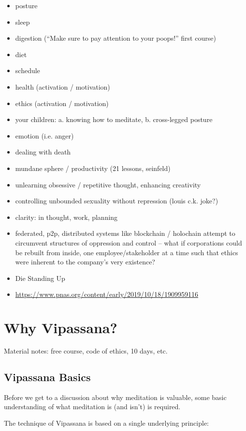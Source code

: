 \documentclass[a4paper, amsfonts, amssymb, amsmath, reprint, showkeys, nofootinbib, twoside]{revtex4-1}
\begin{document}
\begin{itemize}
  \item posture
  \item sleep
  \item digestion (``Make sure to pay attention to your poops!'' first course)
  \item diet
  \item schedule
  \item health (activation / motivation)
  \item ethics (activation / motivation)
  \item your children: a. knowing how to meditate, b. cross-legged posture
  \item emotion (i.e. anger)
  \item dealing with death
  \item mundane sphere / productivity (21 lessons, seinfeld)
  \item unlearning obsessive / repetitive thought, enhancing creativity
  \item controlling unbounded sexuality without repression (louis c.k. joke?)
  \item clarity: in thought, work, planning
  \item federated, p2p, distributed systems like blockchain / holochain attempt to circumvent
    structures of oppression and control -- what if corporations could be rebuilt from inside,
    one employee/stakeholder at a time such that ethics were inherent to the company's very
    existence?
  \item Die Standing Up
  \item \url{https://www.pnas.org/content/early/2019/10/18/1909959116}
\end{itemize}


\section{Why Vipassana?}

Material notes: free course, code of ethics, 10 days, etc.

\subsection{Vipassana Basics}

Before we get to a discussion about why meditation is valuable, some basic
understanding of what meditation is (and isn't) is required.

The technique of Vipassana is based on a single underlying principle:
\end{document}
